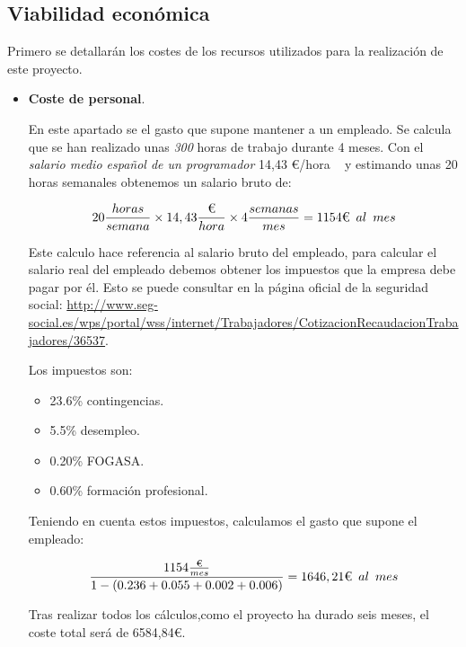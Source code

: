 \subsection{Viabilidad económica}
Primero se detallarán los costes de los recursos utilizados para la realización de este proyecto.

\begin{itemize}
	\item \textbf{Coste de personal}.
	
	En este apartado se el gasto que supone mantener a un empleado. Se calcula que se han realizado unas \emph{300} horas de trabajo durante 4 meses. 
	Con el \textit{salario medio español de un programador} 14,43 €/hora ~\cite{SalarioProgramador} y estimando unas 20 horas semanales obtenemos un salario bruto de:
	

$$ 20\frac{horas}{semana}\times14,43\frac{\text{€}}{hora}\times4\frac{semanas}{mes}=1154\text{€}\hspace{0.5em}al\hspace{0.5em}mes  $$

Este calculo hace referencia al salario bruto del empleado, para calcular el salario real del empleado debemos  obtener los impuestos que la empresa debe pagar por él. Esto se puede consultar en la página oficial de la seguridad social: \url{http://www.seg-social.es/wps/portal/wss/internet/Trabajadores/CotizacionRecaudacionTrabajadores/36537}.

Los impuestos son:
\begin{itemize}
	\tightlist
	\item 23.6\% contingencias.
	\item 5.5\% desempleo.
	\item 0.20\% FOGASA.
	\item 0.60\% formación profesional.
\end{itemize}



Teniendo en cuenta estos impuestos, calculamos el gasto que supone el empleado:

$$\frac{1154\frac{\text{€}}{mes}}{1-(0.236+0.055+0.002+0.006)}=1646,21\text{€}\hspace{0.5em}al\hspace{0.5em}mes$$

Tras realizar todos los cálculos,como el proyecto ha durado seis meses, el coste total será de 6584,84€.


\end{itemize}
